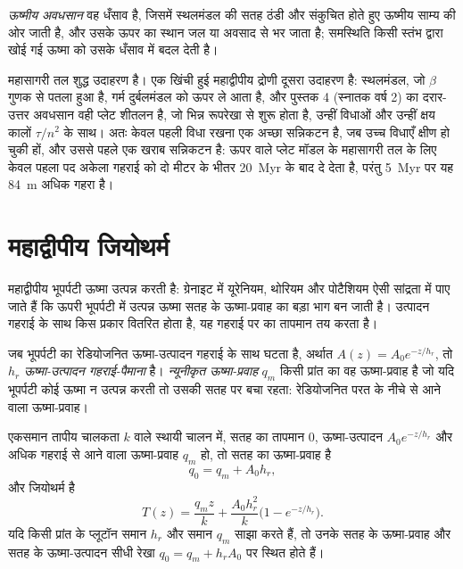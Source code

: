 \begin{definition}[ऊष्मीय अवधसान]\label{def:b3:lithosphere-thermal-models:thermal-subsidence}
\emph{ऊष्मीय अवधसान} वह धँसाव है, जिसमें स्थलमंडल
की सतह ठंडी और संकुचित होते हुए ऊष्मीय साम्य की ओर जाती है,
और उसके ऊपर का स्थान जल या अवसाद से भर जाता है;
समस्थिति किसी स्तंभ द्वारा खोई गई ऊष्मा को उसके धँसाव में बदल देती है।
\end{definition}

महासागरी तल शुद्ध उदाहरण है। एक खिंची हुई महाद्वीपीय द्रोणी दूसरा उदाहरण है:
स्थलमंडल, जो $\beta$ गुणक से पतला हुआ है, गर्म दुर्बलमंडल को ऊपर ले आता है, और
पुस्तक 4 (स्नातक वर्ष 2) का दरार-उत्तर अवधसान वही प्लेट शीतलन है, जो
भिन्न रूपरेखा से शुरू होता है, उन्हीं विधाओं और उन्हीं क्षय कालों $\tau/n^2$ के साथ।
अतः केवल पहली विधा रखना एक अच्छा सन्निकटन है, जब उच्च विधाएँ क्षीण हो चुकी हों,
और उससे पहले एक खराब सन्निकटन है: ऊपर वाले प्लेट मॉडल के महासागरी तल के लिए
केवल पहला पद अकेला गहराई को दो मीटर के भीतर
\qty{20}{Myr} के बाद दे देता है, परंतु \qty{5}{Myr} पर यह \qty{84}{m} अधिक गहरा है।

\section{महाद्वीपीय जियोथर्म}

महाद्वीपीय भूपर्पटी ऊष्मा उत्पन्न करती है: ग्रेनाइट में यूरेनियम, थोरियम और पोटैशियम
ऐसी सांद्रता में पाए जाते हैं कि ऊपरी भूपर्पटी में उत्पन्न ऊष्मा सतह के ऊष्मा-प्रवाह का
बड़ा भाग बन जाती है। उत्पादन गहराई के साथ किस प्रकार वितरित होता है, यह
गहराई पर का तापमान तय करता है।

\begin{definition}[ऊष्मा-उत्पादन गहराई-पैमाना; न्यूनीकृत ऊष्मा-प्रवाह]\label{def:b3:lithosphere-thermal-models:reduced}
जब भूपर्पटी का रेडियोजनित ऊष्मा-उत्पादन गहराई के साथ घटता है, अर्थात
$A(z) = A_0e^{-z/h_r}$, तो $h_r$
\emph{ऊष्मा-उत्पादन गहराई-पैमाना} है। \emph{न्यूनीकृत ऊष्मा-प्रवाह}
$q_m$ किसी प्रांत का वह ऊष्मा-प्रवाह है जो
यदि भूपर्पटी कोई ऊष्मा न उत्पन्न करती तो उसकी सतह पर बचा रहता:
रेडियोजनित परत के नीचे से आने वाला ऊष्मा-प्रवाह।
\end{definition}

\begin{proposition}[घातांकी ऊष्मा-उत्पादन]\label{prop:b3:lithosphere-thermal-models:exponential}
एकसमान तापीय चालकता $k$ वाले स्थायी चालन में, सतह का तापमान $0$,
ऊष्मा-उत्पादन $A_0e^{-z/h_r}$ और अधिक गहराई से आने वाला ऊष्मा-प्रवाह $q_m$ हो, तो
सतह का ऊष्मा-प्रवाह है
\[
  q_0 = q_m + A_0h_r,
\]
और जियोथर्म है
\[
  T(z) = \frac{q_mz}{k} + \frac{A_0h_r^2}{k}\bigl(1 - e^{-z/h_r}\bigr).
\]
यदि किसी प्रांत के प्लूटॉन समान $h_r$ और समान $q_m$ साझा करते हैं, तो उनके
सतह के ऊष्मा-प्रवाह और सतह के ऊष्मा-उत्पादन सीधी रेखा
$q_0 = q_m + h_rA_0$ पर स्थित होते हैं।
\end{proposition}


